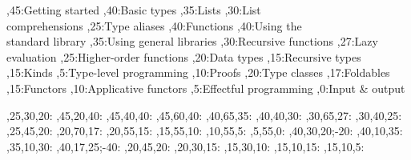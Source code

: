 
\setcounter{diagheight}{50}
\begin{chart}
	,45:{Getting started}
	,40:{Basic types}
	,35:{Lists}
	,30:{List\\comprehensions}
	,25:{Type aliases}
	,40:{Functions}
	,40:{Using the\\standard library}
	,35:{Using general libraries}
	,30:{Recursive functions}
	,27:{Lazy evaluation}
	,25:{Higher-order functions}
	,20:{Data types}
	,15:{Recursive types}
	,15:{Kinds}
	,5:{Type-level programming}
	,10:{Proofs}
	,20:{Type classes}
	,17:{Foldables}
	,15:{Functors}
	,10:{Applicative functors}
	,5:{Effectful programming}
	,0:{Input \& output}
	
	,25,30,20:
	,45,20,40:
	,45,40,40:
	,45,60,40:
	,40,65,35:
	,40,40,30:
	,30,65,27:
	,30,40,25:
	,25,45,20:
	,20,70,17:
	,20,55,15:
	,15,55,10:
	,10,55,5:
	,5,55,0:
	,40,30,20;-20:
	,40,10,35:
	,35,10,30:
	,40,17,25;-40:
	,20,45,20:
	,20,30,15:
	,15,30,10:
	,15,10,15:
	,15,10,5:
\end{chart}

